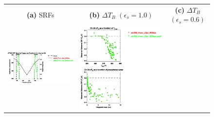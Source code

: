 \begin{figure}[H]
  \centering
  \begin{tabular}{c c c}
    \textsf{\textbf{(a)} SRFs} &
    \textsf{\textbf{(b)} $\Delta T_B$ $(\epsilon_s = 1.0)$} &
    \textsf{\textbf{(c)} $\Delta T_B$ $(\epsilon_s = 0.6)$} \\
    \includegraphics[bb=80 400 280 558,clip,scale=0.85]{graphics/srf/Rset/atms_npp.ch20.osrf.eps} &
    \includegraphics[bb=85 400 260 558,clip,scale=0.85]{graphics/dtb/Rset/e1.0_r0.0/atms_npp.ch20.dTb.eps} & 

\end{tabular}
\end{figure}
